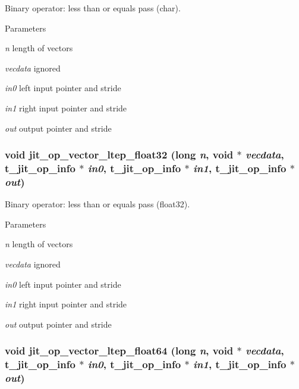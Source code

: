 Binary operator: less than or equals pass (char). 
\begin{DoxyParams}{Parameters}
\item[{\em n}]length of vectors \item[{\em vecdata}]ignored \item[{\em in0}]left input pointer and stride \item[{\em in1}]right input pointer and stride \item[{\em out}]output pointer and stride \end{DoxyParams}
\hypertarget{group__opvecmod_ga39ea14122ac8e782d5065144e71be3aa}{
\subsubsection[{jit\_\-op\_\-vector\_\-ltep\_\-float32}]{\setlength{\rightskip}{0pt plus 5cm}void jit\_\-op\_\-vector\_\-ltep\_\-float32 (long {\em n}, \/  void $\ast$ {\em vecdata}, \/  {\bf t\_\-jit\_\-op\_\-info} $\ast$ {\em in0}, \/  {\bf t\_\-jit\_\-op\_\-info} $\ast$ {\em in1}, \/  {\bf t\_\-jit\_\-op\_\-info} $\ast$ {\em out})}}
\label{group__opvecmod_ga39ea14122ac8e782d5065144e71be3aa}


Binary operator: less than or equals pass (float32). 
\begin{DoxyParams}{Parameters}
\item[{\em n}]length of vectors \item[{\em vecdata}]ignored \item[{\em in0}]left input pointer and stride \item[{\em in1}]right input pointer and stride \item[{\em out}]output pointer and stride \end{DoxyParams}
\hypertarget{group__opvecmod_gaac77d494c9dbb01feb79bda7316886d5}{
\subsubsection[{jit\_\-op\_\-vector\_\-ltep\_\-float64}]{\setlength{\rightskip}{0pt plus 5cm}void jit\_\-op\_\-vector\_\-ltep\_\-float64 (long {\em n}, \/  void $\ast$ {\em vecdata}, \/  {\bf t\_\-jit\_\-op\_\-info} $\ast$ {\em in0}, \/  {\bf t\_\-jit\_\-op\_\-info} $\ast$ {\em in1}, \/  {\bf t\_\-jit\_\-op\_\-info} $\ast$ {\em out})}}
\label{group__opvecmod_gaac77d494c9dbb01feb79bda7316886d5}


